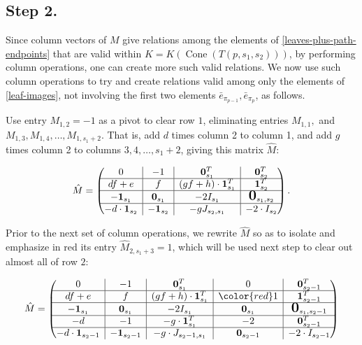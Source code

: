\documentclass[10pt,reqno]{amsart}
\newcommand{\bigzero}{\mbox{\normalfont\Large\bfseries 0}}
\newcommand{\rvline}{\hspace*{-\arraycolsep}\vline\hspace*{-\arraycolsep}}
\DeclareMathOperator{\Cone}{Cone}
\def\onesvector{\mathbf{1}}
\def\zerovector{\mathbf{0}}
\begin{document}
\subsection{Step 2.}
 Since column vectors of $M$ give relations among
 the elements of \eqref{leaves-plus-path-endpoints} that are 
valid within $K=K(\Cone(T(p,s_1,s_2)))$,
by performing column operations, one can create more such valid relations.  We now use such column operations to try and create relations valid among only the elements of 
\eqref{leaf-images},
not involving the first two elements $
\bar{e}_{\pi_{p-1}},
\bar{e}_{\pi_p}$, as follows.

Use entry $M_{1,2}=-1$ as a pivot to clear row $1$,
eliminating entries $M_{1,1},$ and $M_{1,3},M_{1,4},\ldots,M_{1,s_1+2}$.  That is, add $d$ times column 2 to column 1, and add $g$ times column 2 to columns $3,4,\ldots, s_1+2$, giving this matrix $\hat M$:
 
\begin{equation}
\hat M=
\begin{pmatrix}
0 & \rvline & -1 & \rvline & \zerovector^T_{s_1} & \rvline & \zerovector^T_{s_2}  \\
\hline
df+e & \rvline & f & \rvline & (gf+h)\cdot\onesvector^T_{s_1} &\rvline & \onesvector^T_{s_2} \\
\hline
-\onesvector_{s_1} & \rvline & \zerovector_{s_1} & \rvline & -2 I_{s_1}& \rvline & \bigzero_{s_1,s_2} \\
\hline
-d \cdot \onesvector_{s_2} & \rvline & -\onesvector_{s_2} & \rvline & -g J_{s_2,s_1}& \rvline & -2\cdot I_{s_2} 
\end{pmatrix}.
\end{equation}

Prior to the next set of column operations, we rewrite $\hat{M}$ so as to isolate and emphasize in red its entry $\hat{M}_{2,s_1+3}=1$, which will be used next step to clear out almost all of row $2$:

\begin{equation*}    
\hat{M}=
\begin{pmatrix}
0 & \rvline & -1 & \rvline & \zerovector^T_{s_1} & \rvline &0 &\rvline&\zerovector^T_{s_2-1}  \\
\hline
df+e & \rvline & f & \rvline & (gf+h)\cdot\onesvector^T_{s_1} &\rvline & 
{\color{red}1}& \rvline &\onesvector^T_{s_2-1} \\
\hline
-\onesvector_{s_1} & \rvline & \zerovector_{s_1} & \rvline & -2 I_{s_1}& \rvline & \zerovector_{s_1}&\rvline&\bigzero_{s_1,s_2-1} \\
\hline
-d  & \rvline & -1 & \rvline & -g \cdot \onesvector^T_{s_1}& \rvline &-2&\rvline& \zerovector^T_{s_2-1} \\
\hline
-d\cdot \onesvector_{s_2-1} & \rvline & -\onesvector_{s_2-1} & \rvline & -g \cdot J_{s_2-1,s_1}& \rvline &\zerovector_{s_2-1} &\rvline& -2\cdot I_{s_2-1} 

\end{pmatrix}
\end{equation*}
\end{document}
